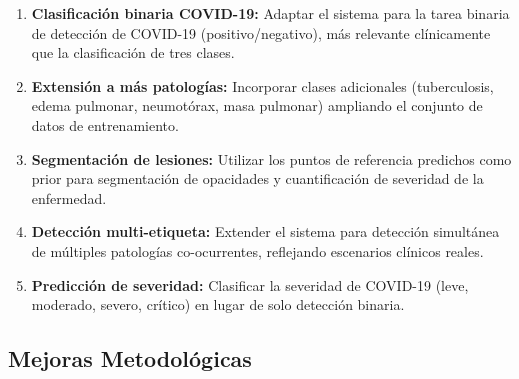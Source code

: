 \begin{enumerate}
    \item \textbf{Clasificación binaria COVID-19:} Adaptar el sistema para la tarea binaria de detección de COVID-19 (positivo/negativo), más relevante clínicamente que la clasificación de tres clases.

    \item \textbf{Extensión a más patologías:} Incorporar clases adicionales (tuberculosis, edema pulmonar, neumotórax, masa pulmonar) ampliando el conjunto de datos de entrenamiento.

    \item \textbf{Segmentación de lesiones:} Utilizar los puntos de referencia predichos como prior para segmentación de opacidades y cuantificación de severidad de la enfermedad.

    \item \textbf{Detección multi-etiqueta:} Extender el sistema para detección simultánea de múltiples patologías co-ocurrentes, reflejando escenarios clínicos reales.

    \item \textbf{Predicción de severidad:} Clasificar la severidad de COVID-19 (leve, moderado, severo, crítico) en lugar de solo detección binaria.
\end{enumerate}

\subsection{Mejoras Metodológicas}
\label{subsec:trabajos_futuros_mejoras}

